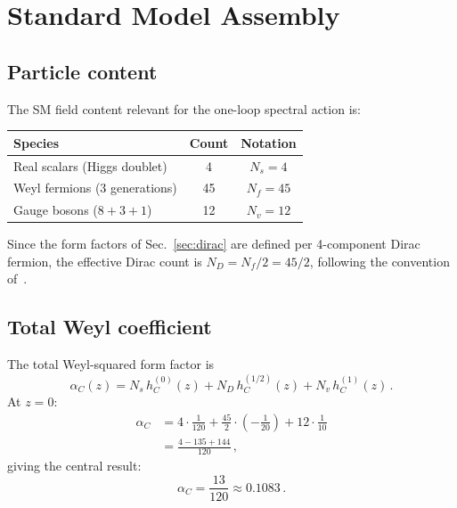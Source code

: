 \documentclass[aps,prd,twocolumn,superscriptaddress,nofootinbib,floatfix]{revtex4-2}
\begin{document}
\section{Standard Model Assembly}
\label{sec:sm}

\subsection{Particle content}

The SM field content relevant for the one-loop spectral action is:
\begin{center}
\renewcommand{\arraystretch}{1.2}
\begin{tabular}{@{}lcc@{}}
  \toprule
  Species & Count & Notation \\
  \midrule
  Real scalars (Higgs doublet) & 4 & $N_s = 4$ \\
  Weyl fermions (3 generations) & 45 & $N_f = 45$ \\
  Gauge bosons ($8+3+1$) & 12 & $N_v = 12$ \\
  \bottomrule
\end{tabular}
\end{center}

Since the form factors of Sec.~\ref{sec:dirac} are defined per 4-component
Dirac fermion, the effective Dirac count is $N_D = N_f/2 = 45/2$, following the
convention of~\cite{Codello:2008vh}.

\subsection{Total Weyl coefficient}

The total Weyl-squared form factor is
\begin{equation}
  \alpha_C(z) = N_s\,h_C^{(0)}(z) + N_D\,h_C^{(1/2)}(z)
    + N_v\,h_C^{(1)}(z)\,.
  \label{eq:alphaC-z}
\end{equation}
At $z = 0$:
\begin{align}
  \alpha_C &= 4 \cdot \frac{1}{120}
    + \frac{45}{2}\cdot\!\left(-\frac{1}{20}\right)
    + 12 \cdot \frac{1}{10} \nonumber\\
  &= \frac{4 - 135 + 144}{120}\,,
  \label{eq:alphaC-sum}
\end{align}
giving the central result:
\begin{equation}
  \boxed{\alpha_C = \frac{13}{120} \approx 0.1083\,.}
  \label{eq:alphaC}
\end{equation}
\end{document}
